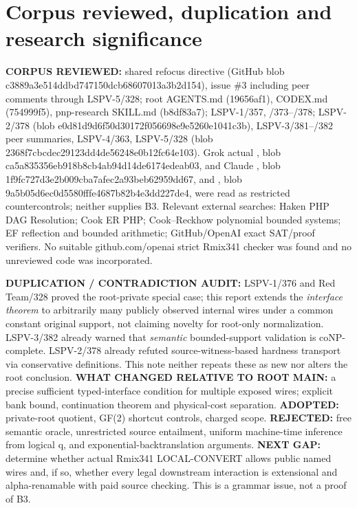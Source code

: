 \documentclass[11pt]{article}
\begin{document}
\section*{Corpus reviewed, duplication and research significance}
\noindent\textbf{CORPUS REVIEWED:} shared refocus directive (GitHub blob c3889a3e514ddbd747150dcb68607013a3b2d154), issue \#3 including peer comments through LSPV-5/328; root AGENTS.md (19656af1), CODEX.md (754999f5), pnp-research SKILL.md (b8df83a7); LSPV-1/357, /373--/378; LSPV-2/378 (blob e0d81d9d6f50d30172f056698e9e5260e1041c3b), LSPV-3/381--/382 peer summaries, LSPV-4/363, LSPV-5/328 (blob 2368f7cbcdec29123dd4de56248e0b12fc64e103). Grok actual , blob ca5a835356eb918b8cb4ab94d14de6174edeab03, and Claude , blob 1f9fc727d3e2b009cba7afec2a93beb62959dd67, and , blob 9a5b05d6ec0d5580fffe4687b82b4e3dd227de4, were read as restricted countercontrols; neither supplies B3. Relevant external searches: Haken PHP DAG Resolution; Cook ER PHP; Cook--Reckhow polynomial bounded systems; EF reflection and bounded arithmetic; GitHub/OpenAI exact SAT/proof verifiers. No suitable github.com/openai strict Rmix341 checker was found and no unreviewed code was incorporated.

\noindent\textbf{DUPLICATION / CONTRADICTION AUDIT:} LSPV-1/376 and Red Team/328 proved the root-private special case; this report extends the \emph{interface theorem} to arbitrarily many publicly observed internal wires under a common constant original support, not claiming novelty for root-only normalization. LSPV-3/382 already warned that \emph{semantic} bounded-support validation is coNP-complete. LSPV-2/378 already refuted source-witness-based hardness transport via conservative definitions. This note neither repeats these as new nor alters the root conclusion. \textbf{WHAT CHANGED RELATIVE TO ROOT MAIN:} a precise sufficient typed-interface condition for multiple exposed wires; explicit bank bound, continuation theorem and physical-cost separation. \textbf{ADOPTED:} private-root quotient, GF(2) shortcut controls, charged scope. \textbf{REJECTED:} free semantic oracle, unrestricted source entailment, uniform machine-time inference from logical q, and exponential-backtranslation arguments. \textbf{NEXT GAP:} determine whether actual Rmix341 LOCAL-CONVERT allows public named wires and, if so, whether every legal downstream interaction is extensional and alpha-renamable with paid source checking. This is a grammar issue, not a proof of B3.
\end{document}

